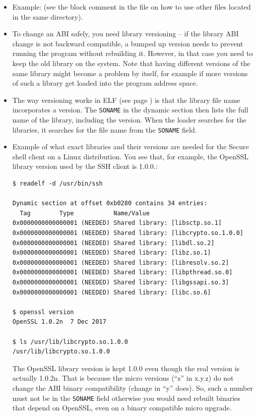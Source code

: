 \begin{itemize}
\begin{verbatim}
$ gcc -m32 -shared -o libadd.so add2.c
$ ./a.out
-1077941135
\end{verbatim}

\item {} Example:  (see the block
comment in the file on how to use other files located in the same directory).
\item To change an ABI safely, you need library versioning -- if the library
ABI change is not backward compatible, a bumped up version needs to prevent
running the program without rebuilding it.   However, in that case you need to keep
the old library on the system.  Note that having different versions of the same
library might become a problem by itself, for example if more versions of such
a library get loaded into the program address space.
\item The way versioning works in ELF (see page \pageref{ELF}) is that the
library file name incorporates a version.  The \texttt{SONAME} in the dynamic
section then lists the full name of the library, including the version.  When
the loader searches for the libraries, it searches for the file name from the
\texttt{SONAME} field.
\item Example of what exact libraries and their versions are needed for the
Secure shell client on a Linux distribution.  You see that, for example, the
OpenSSL library version used by the SSH client is 1.0.0.:

\begin{verbatim}
$ readelf -d /usr/bin/ssh

Dynamic section at offset 0xb0280 contains 34 entries:
  Tag        Type           Name/Value
0x0000000000000001 (NEEDED) Shared library: [libsctp.so.1]
0x0000000000000001 (NEEDED) Shared library: [libcrypto.so.1.0.0]
0x0000000000000001 (NEEDED) Shared library: [libdl.so.2]
0x0000000000000001 (NEEDED) Shared library: [libz.so.1]
0x0000000000000001 (NEEDED) Shared library: [libresolv.so.2]
0x0000000000000001 (NEEDED) Shared library: [libpthread.so.0]
0x0000000000000001 (NEEDED) Shared library: [libgssapi.so.3]
0x0000000000000001 (NEEDED) Shared library: [libc.so.6]

$ openssl version
OpenSSL 1.0.2n  7 Dec 2017

$ ls /usr/lib/libcrypto.so.1.0.0
/usr/lib/libcrypto.so.1.0.0
\end{verbatim}

\par The OpenSSL library version is kept 1.0.0 even though the real version is
actually 1.0.2n.  That is because the micro versions (``z'' in x.y.z) do not
change the ABI binary compatibility (change in ``y'' does).  So, such a number
must not be in the \texttt{SONAME} field otherwise you would need rebuilt
binaries that depend on OpenSSL, even on a binary compatible micro upgrade.
\end{itemize}


